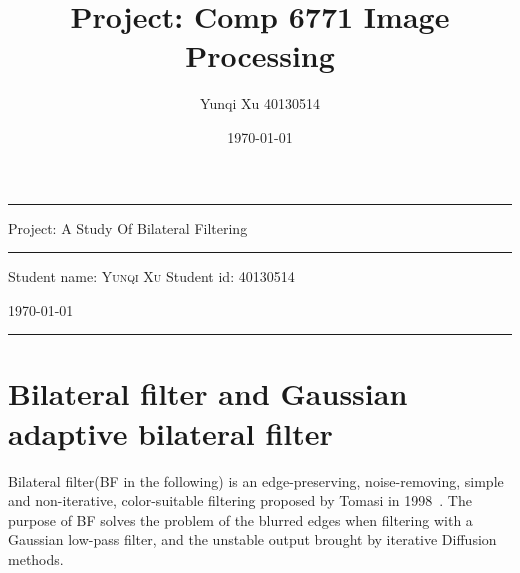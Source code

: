 \documentclass[12pt]{article}
\title{Project: Comp 6771 Image Processing}
\author{Yunqi Xu 40130514}
\date{\today}
\begin{document}
\begin{titlepage}
  \rule{\textwidth}{1pt}   %
    \vspace{0.2\textheight}  %


    {\Huge Project: A Study Of Bilateral Filtering}

    \vspace{0.025\textheight}   %

    \rule{0.83\textwidth}{0.4pt}  %

    \vspace{0.1\textheight}  %


    {\Large Student name: \textsc{Yunqi Xu}}
    \vfill
    {\Large Student id: 40130514}
    \vfill  %

    {\large \today}
    \vspace{0.1\textheight}  %


    \rule{\textwidth}{1pt}  %
\end{titlepage}

\section{Bilateral filter and Gaussian adaptive bilateral filter}
\label{section review bilateral}
Bilateral filter(BF in the following) is an edge-preserving, noise-removing, simple and non-iterative, color-suitable filtering proposed by Tomasi in 1998~\cite{paper_bf}.
The purpose of BF solves the problem of the blurred edges when filtering with a Gaussian low-pass filter, and the unstable output brought by iterative Diffusion methods.
\end{document}
